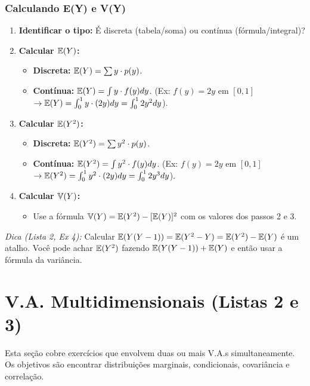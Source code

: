 \subsubsection{Calculando E(Y) e V(Y)}
\begin{enumerate}
    \item \textbf{Identificar o tipo:} É discreta (tabela/soma) ou contínua (fórmula/integral)?
    \item \textbf{Calcular $\mathbb{E}(Y)$:}
    \begin{itemize}
        \item \textbf{Discreta:} $\mathbb{E}(Y) = \sum y \cdot p(y)$.
        \item \textbf{Contínua:} $\mathbb{E}(Y) = \int y \cdot f(y) dy$. (Ex: $f(y)=2y$ em $[0,1]$ $\rightarrow \mathbb{E}(Y) = \int_0^1 y \cdot (2y) dy = \int_0^1 2y^2 dy$).
    \end{itemize}
    \item \textbf{Calcular $\mathbb{E}(Y^2)$:}
    \begin{itemize}
        \item \textbf{Discreta:} $\mathbb{E}(Y^2) = \sum y^2 \cdot p(y)$.
        \item \textbf{Contínua:} $\mathbb{E}(Y^2) = \int y^2 \cdot f(y) dy$. (Ex: $f(y)=2y$ em $[0,1]$ $\rightarrow \mathbb{E}(Y^2) = \int_0^1 y^2 \cdot (2y) dy = \int_0^1 2y^3 dy$).
    \end{itemize}
    \item \textbf{Calcular $\mathbb{V}(Y)$:}
    \begin{itemize}
        \item Use a fórmula $\mathbb{V}(Y) = \mathbb{E}(Y^2) - [\mathbb{E}(Y)]^2$ com os valores dos passos 2 e 3.
    \end{itemize}
\end{enumerate}
\textit{Dica (Lista 2, Ex 4):} Calcular $\mathbb{E}(Y(Y-1)) = \mathbb{E}(Y^2 - Y) = \mathbb{E}(Y^2) - \mathbb{E}(Y)$ é um atalho. Você pode achar $\mathbb{E}(Y^2)$ fazendo $\mathbb{E}(Y(Y-1)) + \mathbb{E}(Y)$ e então usar a fórmula da variância.

\section{V.A. Multidimensionais (Listas 2 e 3)}
\label{sec:va_multi}
Esta seção cobre exercícios que envolvem duas ou mais V.A.s simultaneamente. Os objetivos são encontrar distribuições marginais, condicionais, covariância e correlação.

